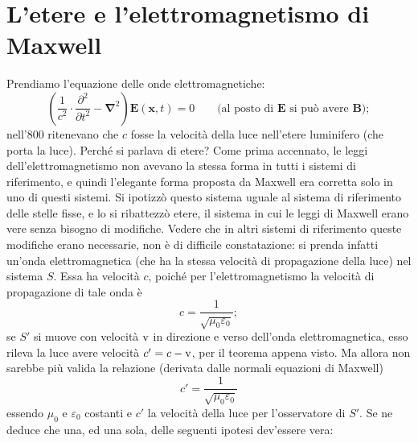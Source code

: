 \section{L'etere e l'elettromagnetismo di Maxwell}
Prendiamo l'equazione delle onde elettromagnetiche:
\begin{displaymath}
  \left(\frac{1}{c^2}\cdot\frac{\partial^2}{\partial
      t^2}-\mathbf{\nabla}^2\right)\mathbf{E}(\mathbf{x},t)=0 \qquad
  \mbox{(al posto di $\mathbf{E}$ si pu\`o avere $\mathbf{B}$)};
\end{displaymath}
nell'800 ritenevano che $c$ fosse la velocit\`a della luce nell'etere
luminifero (che porta la luce). Perch\'e si parlava di etere? 
%
%
Come prima accennato, le leggi dell'elettromagnetismo non avevano la
stessa forma in tutti i sistemi di riferimento, e quindi l'elegante
forma proposta da Maxwell era corretta solo in uno di questi
sistemi. Si ipotizz\`o questo sistema uguale al sistema di riferimento
delle stelle fisse, e lo si ribattezz\`o etere, il sistema in cui le
leggi di Maxwell erano vere senza bisogno di modifiche.
Vedere che in altri sistemi di riferimento queste modifiche erano
necessarie, non \`e di difficile constatazione: si prenda infatti
un'onda elettromagnetica (che ha la stessa velocit\`a di propagazione
della luce) nel sistema $S$. Essa ha velocit\`a $c$, poich\'e per
l'elettromagnetismo la velocit\`a di propagazione di tale onda \`e
\begin{equation}
  c=\frac{1}{\sqrt{\mu_0\varepsilon_0}};
\end{equation}
se $S'$ si muove con velocit\`a $\mathrm{v}$ in direzione e verso
dell'onda elettromagnetica, esso rileva la luce avere velocit\`a
$c'=c-\mathrm{v}$, per il teorema appena visto. Ma allora non sarebbe pi\`u
valida la relazione (derivata dalle normali equazioni di Maxwell)
\begin{displaymath}
  c'=\frac{1}{\sqrt{\mu_0\varepsilon_0}}
\end{displaymath}
essendo $\mu_0$ e $\varepsilon_0$ costanti e \(c'\) la velocit\`a della
luce per l'osservatore di \(S'\). Se ne deduce che una, ed
una sola, delle seguenti ipotesi dev'essere vera:
